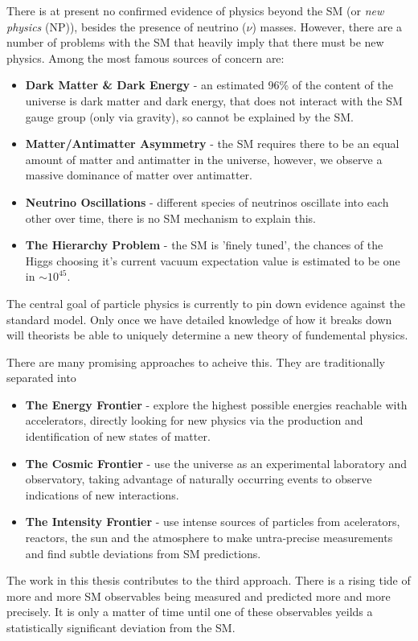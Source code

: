 There is at present no confirmed evidence of physics beyond the SM (or {\it{new physics}} (NP)), besides the presence of neutrino ($\nu$) masses. However, there are a number of problems with the SM that heavily imply that there must be new physics. Among the most famous sources of concern are:
\begin{itemize}
\item
  {\bf{Dark Matter \& Dark Energy}} - an estimated 96\% of the content of the universe is dark matter and dark energy, that does not interact with the SM gauge group (only via gravity), so cannot be explained by the SM.
\item
  {\bf{Matter/Antimatter Asymmetry}} - the SM requires there to be an equal amount of matter and antimatter in the universe, however, we observe a massive dominance of matter over antimatter.
\item
  {\bf{Neutrino Oscillations}} - different species of neutrinos oscillate into each other over time, there is no SM mechanism to explain this.
\item
  {\bf{The Hierarchy Problem}} - the SM is 'finely tuned', the chances of the Higgs choosing it's current vacuum expectation value is estimated to be one in $\sim 10^{45}$.
\end{itemize}

The central goal of particle physics is currently to pin down evidence against the standard model. Only once we have detailed knowledge of how it breaks down will theorists be able to uniquely determine a new theory of fundemental physics.

There are many promising approaches to acheive this. They are traditionally separated into
\begin{itemize}
\item
  {\bf{The Energy Frontier}} - explore the highest possible energies reachable with accelerators, directly looking for new physics via the production and identification of new states of matter.
\item
  {\bf{The Cosmic Frontier}} - use the universe as an experimental laboratory and observatory,  taking advantage  of  naturally  occurring  events to  observe  indications  of  new  interactions.
\item
  {\bf{The Intensity Frontier}} - use intense sources of particles from acelerators, reactors, the sun and the atmosphere to make untra-precise measurements and find subtle deviations from SM predictions.
\end{itemize}
The work in this thesis contributes to the third approach. There is a rising tide of more and more SM observables being measured and predicted more and more precisely. It is only a matter of time until one of these observables yeilds a statistically significant deviation from the SM.

